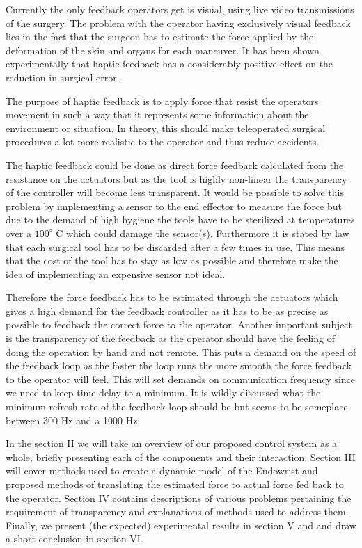\documentclass[conference]{IEEEtran}
\begin{document}
Currently the only feedback operators get is visual, using live video transmissions of the surgery. 
The problem with the operator having exclusively visual feedback lies in the fact that the surgeon has to estimate the force applied by the deformation of the skin and organs for each maneuver. %
It has been shown experimentally that haptic feedback has a considerably positive effect on the reduction in surgical error\cite{EOFGFF}. 

The purpose of haptic feedback is to apply force that resist the operators movement in such a way that it represents some information about the environment or situation.
In theory, this should make teleoperated surgical procedures a lot more realistic to the operator and thus reduce accidents.

The haptic feedback could be done as direct force feedback calculated from the resistance on the actuators but as the tool is highly non-linear the transparency of the controller will become less transparent.
It would be possible to solve this problem by implementing a sensor to the end effector to measure the force but due to the demand of high hygiene the tools have to be sterilized at temperatures over a $100^\circ$ C which could damage the sensor(s). Furthermore it is stated by law that each surgical tool has to be discarded after a few times in use. This means that the cost of the tool has to stay as low as possible and therefore make the idea of implementing an expensive sensor not ideal.

Therefore the force feedback has to be estimated through the actuators which gives a high demand for the feedback controller as it has to be as precise as possible to feedback the correct force to the operator. Another important subject is the transparency of the feedback as the operator should have the feeling of doing the operation by hand and not remote. This puts a demand on the speed of the feedback loop as the faster the loop runs the more smooth the force feedback to the operator will feel. This will set demands on communication frequency since we need to keep time delay to a minimum. It is wildly discussed what the minimum refresh rate of the feedback loop should be but seems to be someplace between 300 Hz and a 1000 Hz\cite{coles2011role}. 

In the section II we will take an overview of our proposed control system as a whole, briefly presenting each of the components and their interaction.
Section III will cover methods used to create a dynamic model of the Endowrist and proposed methods of translating the estimated force to actual force fed back to the operator.
Section IV contains descriptions of various problems pertaining the requirement of transparency and explanations of methods used to address them.
Finally,  we present (the expected) experimental results in section V and and draw a short conclusion in section VI.
 
\end{document}
